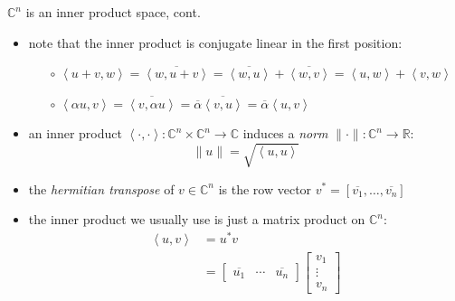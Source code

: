 \documentclass[10pt,hyperref]{beamer}
\newcommand{\CC}{\mathbb{C}}
\newcommand{\RR}{\mathbb{R}}
\newcommand{\ip}[2]{\left<#1,#2\right>}
\begin{document}
\begin{frame}{$\CC^n$ is an inner product space, cont.}

\begin{itemize}
\item note that the inner product is conjugate linear in the first position:
    \begin{itemize}
    \item[$\circ$] $\ip{u+v}{w} = \overline{\ip{w}{u+v}} = \overline{\ip{w}{u}} + \overline{\ip{w}{v}} = \ip{u}{w} + \ip{v}{w}$
    \item[$\circ$] $\ip{\alpha u}{v} =\overline{\ip{v}{\alpha u}} = \overline{\alpha} \overline{\ip{v}{u}} =\overline{\alpha} \ip{u}{v}$
    \end{itemize}
\item an inner product $\ip{\cdot}{\cdot} : \CC^n \times \CC^n \to \CC$ induces a \emph{norm} $\|\cdot\|:\CC^n \to \RR$:
    $$\|u\| = \sqrt{\ip{u}{u}}$$
\item the \emph{hermitian transpose} of $v\in\CC^n$ is the row vector $v^* = [\overline{v_1},\dots,\overline{v_n}]$
\item the inner product we usually use is just a matrix product on $\CC^n$:
\begin{align*}
\ip{u}{v} &= u^* v \\
          &= \begin{bmatrix}
    \overline{u_1} & \cdots & \overline{u_n}
    \end{bmatrix} \begin{bmatrix}
    v_1 \\ \vdots \\ v_n
    \end{bmatrix}
\end{align*}
\end{itemize}
\end{frame}
\end{document}
